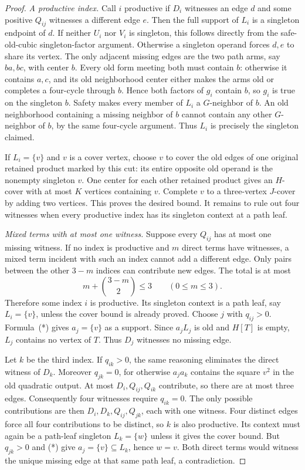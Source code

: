 \documentclass[11pt]{article}
\theoremstyle{definition}
\theoremstyle{remark}
\begin{document}
\begin{proof}
\emph{A productive index.} Call $i$ productive if $D_i$ witnesses an edge $d$ and some positive $Q_{ij}$ witnesses a different edge $e$. Then the full support of $L_i$ is a singleton endpoint of $d$. If neither $U_i$ nor $V_i$ is singleton, this follows directly from the safe-old-cubic singleton-factor argument. Otherwise a singleton operand forces $d,e$ to share its vertex. The only adjacent missing edges are the two path arms, say $ba,bc$, with center $b$. Every old form meeting both must contain $b$: otherwise it contains $a,c$, and its old neighborhood center either makes the arms old or completes a four-cycle through $b$. Hence both factors of $g_i$ contain $b$, so $g_i$ is true on the singleton $b$. Safety makes every member of $L_i$ a $G$-neighbor of $b$. An old neighborhood containing a missing neighbor of $b$ cannot contain any other $G$-neighbor of $b$, by the same four-cycle argument. Thus $L_i$ is precisely the singleton claimed.

If $L_i=\{v\}$ and $v$ is a cover vertex, choose $v$ to cover the old edges of one original retained product marked by this cut: its entire opposite old operand is the nonempty singleton $v$. One center for each other retained product gives an $H$-cover with at most $K$ vertices containing $v$. Complete $v$ to a three-vertex $J$-cover by adding two vertices. This proves the desired bound. It remains to rule out four witnesses when every productive index has its singleton context at a path leaf.

\emph{Mixed terms with at most one witness.} Suppose every $Q_{ij}$ has at most one missing witness. If no index is productive and $m$ direct terms have witnesses, a mixed term incident with such an index cannot add a different edge. Only pairs between the other $3-m$ indices can contribute new edges. The total is at most
\[
m+\binom{3-m}{2}\le3\qquad(0\le m\le3).
\]
Therefore some index $i$ is productive. Its singleton context is a path leaf, say $L_i=\{v\}$, unless the cover bound is already proved. Choose $j$ with $q_{ij}>0$. Formula~(*) gives $a_j=\{v\}$ as a support. Since $a_jL_j$ is old and $H[T]$ is empty, $L_j$ contains no vertex of $T$. Thus $D_j$ witnesses no missing edge.

Let $k$ be the third index. If $q_{ik}>0$, the same reasoning eliminates the direct witness of $D_k$. Moreover $q_{jk}=0$, for otherwise $a_ja_k$ contains the square $v^2$ in the old quadratic output. At most $D_i,Q_{ij},Q_{ik}$ contribute, so there are at most three edges. Consequently four witnesses require $q_{ik}=0$. The only possible contributions are then $D_i,D_k,Q_{ij},Q_{jk}$, each with one witness. Four distinct edges force all four contributions to be distinct, so $k$ is also productive. Its context must again be a path-leaf singleton $L_k=\{w\}$ unless it gives the cover bound. But $q_{jk}>0$ and (*) give $a_j=\{v\}\subseteq L_k$, hence $w=v$. Both direct terms would witness the unique missing edge at that same path leaf, a contradiction.


\end{proof}
\end{document}
